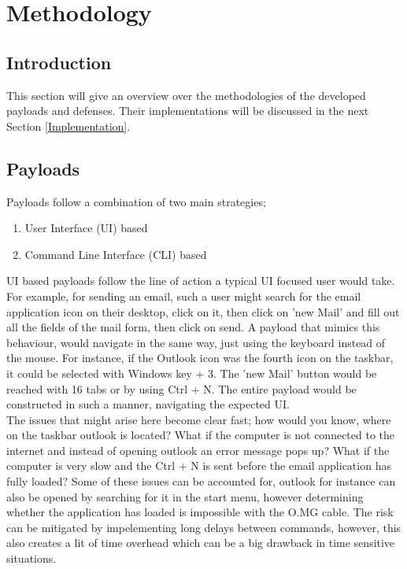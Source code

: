 



\section{Methodology} \label{methodology}

\subsection{Introduction}

This section will give an overview over the methodologies of the developed payloads and defenses. Their implementations will be discussed in the next Section \ref{Implementation}. \\


\subsection{Payloads}

Payloads follow a combination of two main strategies; 
\begin{enumerate}
    \item User Interface (UI) based
    \item Command Line Interface (CLI) based
\end{enumerate}

UI based payloads follow the line of action a typical UI focused user would take. For example, for sending an email, such a user might search for the email application icon on their desktop, click on it, then click on 'new Mail' and fill out all the fields of the mail form, then click on send. A payload that mimics this behaviour, would navigate in the same way, just using the keyboard instead of the mouse. For instance, if the Outlook icon was the fourth icon on the taskbar, it could be selected with Windows key + 3. The 'new Mail' button would be reached with 16 tabs or by using  Ctrl + N. The entire payload would be constructed in such a manner, navigating the expected UI. \\
The issues that might arise here become clear fast; how would you know, where on the taskbar outlook is located? What if the computer is not connected to the internet and instead of opening outlook an error message pops up? What if the computer is very slow and the Ctrl + N is sent before the email application has fully loaded?  Some of these issues can be accounted for, outlook for instance can also be opened by searching for it in the start menu, however determining whether the application has loaded is impossible with the O.MG cable. The risk can be mitigated by impelementing long delays between commands, however, this also creates a lit of time overhead which can be a big drawback in time sensitive situations. \\

